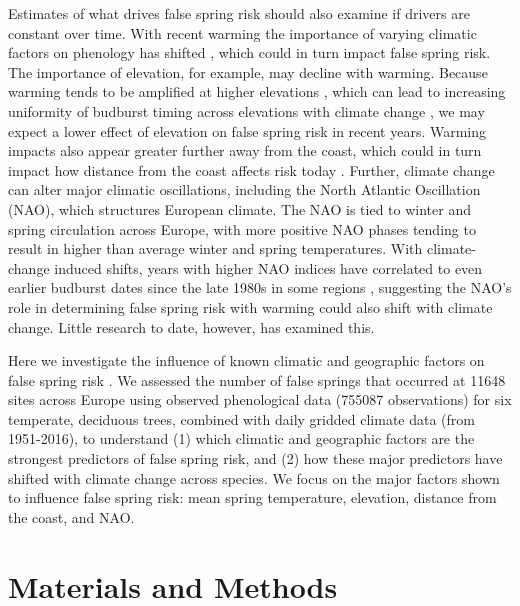 \documentclass{article}\usepackage[]{graphicx}\usepackage[]{color}
\begin{document}
Estimates of what drives false spring risk should also examine if drivers are constant over time. With recent warming the importance of varying climatic factors on phenology has shifted \citep[e.g.,][]{Cook2016,Gauzere2019}, which could in turn impact false spring risk. The importance of elevation, for example, may decline with warming. Because warming tends to be amplified at higher elevations \citep{Giorgi1997,Rangwala2012,Pepin2015}, which can lead to increasing uniformity of budburst timing across elevations with climate change \citep{Vitasse2018}, we may expect a lower effect of elevation on false spring risk in recent years. Warming impacts also appear greater further away from the coast, which could in turn impact how distance from the coast affects risk today \citep{Wypych2016a,Ma2018}. Further, climate change can alter major climatic oscillations, including the North Atlantic Oscillation (NAO), which structures European climate. The NAO  is tied to winter and spring circulation across Europe, with more positive NAO phases tending to result in higher than average winter and spring temperatures. With climate-change induced shifts, years with higher NAO indices have correlated to even earlier budburst dates since the late 1980s in some regions \citep{Chmielewski2001}, suggesting the NAO's role in determining false spring risk with warming could also shift with climate change. Little research to date, however, has examined this. 

Here we investigate the influence of known climatic and geographic factors on false spring risk \citep[defined here as when temperatures fell below -2.2$^{\circ}$C between estimated budburst and leafout for all species included in the study,][]{Schwartz1993}. We assessed the number of false springs that occurred at 11648 sites across Europe using observed phenological data (755087 observations) for six temperate, deciduous trees, combined with daily gridded climate data (from 1951-2016),  to understand (1) which climatic and geographic factors are the strongest predictors of false spring risk, and (2) how these major predictors have shifted with climate change across species. We focus on the major factors shown to influence false spring risk: mean spring temperature, elevation, distance from the coast, and NAO. 

\section*{Materials and Methods} %
\end{document}
